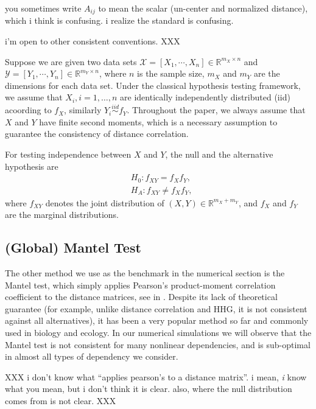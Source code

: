 \documentclass[11pt]{article}
\newcommand{\Real}{\mathbb{R}}
\begin{document}
you sometimes write $A_{ij}$ to mean the scalar (un-center and normalized distance), which i think is confusing. i realize the standard is confusing.

i'm open to other consistent conventions.
XXX


Suppose we are given two data sets $\mathcal{X}=[X_{1},\cdots, X_{n}] \in \Real^{m_{X} \times n}$ and $\mathcal{Y}=[Y_{1},\cdots, Y_{n}] \in \Real^{m_{Y} \times n}$, where $n$ is the sample size, $m_{X}$ and $m_{Y}$ are the dimensions for each data set. Under the classical hypothesis testing framework, we assume that $X_{i}, i=1,\ldots,n$ are identically independently distributed (iid) acoording to $f_X$, similarly $Y_{i} \stackrel{iid}{\sim} f_Y$. Throughout the paper, we always assume that $X$ and $Y$ have finite second moments, which is a necessary assumption to guarantee the consistency of distance correlation.

For testing independence between $X$ and $Y$, the null and the alternative hypothesis are
\begin{align*}
& H_{0}: f_{XY}=f_{X}f_{Y},\\
& H_{A}: f_{XY} \neq f_{X}f_{Y},
\end{align*}
where $f_{XY}$ denotes the joint distribution of $(X,Y) \in \Real^{m_{X} + m_{Y}}$, and $f_{X}$ and $f_{Y}$ are the marginal distributions. 


\subsection{(Global) Mantel Test}
\label{sec:hhg}



The other method we use as the benchmark in the numerical section is the Mantel test, which simply applies Pearson's product-moment correlation coefficient  to the distance matrices, see in \cite{Mantel1967}. Despite its lack of theoretical guarantee (for example, unlike distance correlation and HHG, it is not consistent against all alternatives), it has been a very popular method so far and commonly used in biology and ecology. In our numerical simulations we will observe that the Mantel test is not consistent for many nonlinear dependencies, and is sub-optimal in almost all types of dependency we consider.

XXX i don't know what ``applies pearson's to a distance matrix''.  i mean, \emph{i} know what you mean, but i don't think it is clear.  also, where the null distribution comes from is not clear.  XXX
\end{document}
